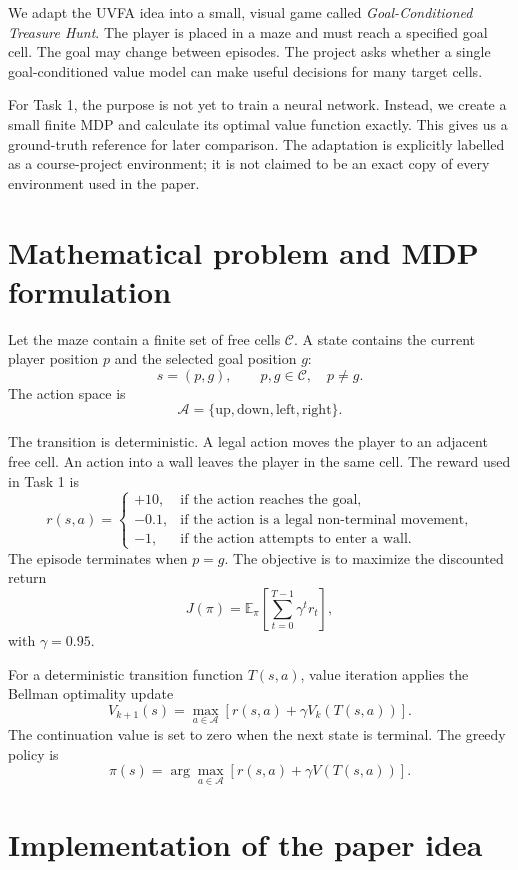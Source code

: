 \documentclass[11pt,a4paper]{article}
\begin{document}
We adapt the UVFA idea into a small, visual game called \emph{Goal-Conditioned
Treasure Hunt}. The player is placed in a maze and must reach a specified goal
cell. The goal may change between episodes. The project asks whether a single
goal-conditioned value model can make useful decisions for many target cells.

For Task 1, the purpose is not yet to train a neural network. Instead, we create
a small finite MDP and calculate its optimal value function exactly. This gives
us a ground-truth reference for later comparison. The adaptation is explicitly
labelled as a course-project environment; it is not claimed to be an exact copy
of every environment used in the paper.

\section{Mathematical problem and MDP formulation}

Let the maze contain a finite set of free cells $\mathcal{C}$. A state contains
the current player position $p$ and the selected goal position $g$:
\[
    s=(p,g), \qquad p,g\in\mathcal{C}, \quad p\neq g.
\]
The action space is
\[
    \mathcal{A}=\{\text{up},\text{down},\text{left},\text{right}\}.
\]

The transition is deterministic. A legal action moves the player to an adjacent
free cell. An action into a wall leaves the player in the same cell. The reward
used in Task 1 is
\[
r(s,a)=
\begin{cases}
+10, & \text{if the action reaches the goal},\\
-0.1, & \text{if the action is a legal non-terminal movement},\\
-1, & \text{if the action attempts to enter a wall}.
\end{cases}
\]
The episode terminates when $p=g$. The objective is to maximize the discounted
return
\[
    J(\pi)=\mathbb{E}_{\pi}\left[\sum_{t=0}^{T-1}\gamma^t r_t\right],
\]
with $\gamma=0.95$.

For a deterministic transition function $T(s,a)$, value iteration applies the
Bellman optimality update
\[
    V_{k+1}(s)=\max_{a\in\mathcal{A}}
    \left[r(s,a)+\gamma V_k(T(s,a))\right].
\]
The continuation value is set to zero when the next state is terminal. The
greedy policy is
\[
    \pi(s)=\arg\max_{a\in\mathcal{A}}
    \left[r(s,a)+\gamma V(T(s,a))\right].
\]

\section{Implementation of the paper idea}
\end{document}
